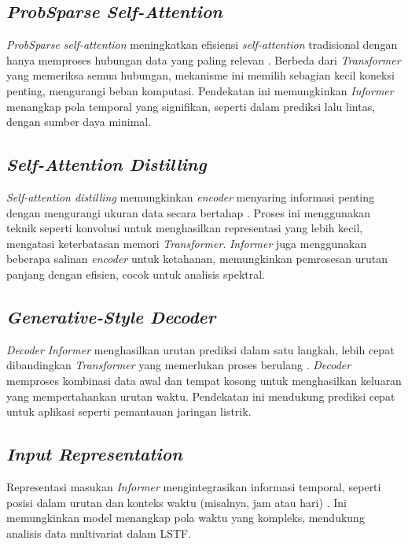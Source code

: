 \subsection{\textit{ProbSparse Self-Attention}}
\label{sec:probsparse}

\textit{ProbSparse self-attention} meningkatkan efisiensi \textit{self-attention} tradisional dengan hanya memproses hubungan data yang paling relevan \citep{Zhou2021}. Berbeda dari \textit{Transformer} yang memeriksa semua hubungan, mekanisme ini memilih sebagian kecil koneksi penting, mengurangi beban komputasi. Pendekatan ini memungkinkan \textit{Informer} menangkap pola temporal yang signifikan, seperti dalam prediksi lalu lintas, dengan sumber daya minimal.

\subsection{\textit{Self-Attention Distilling}}
\label{sec:distilling}

\textit{Self-attention distilling} memungkinkan \textit{encoder} menyaring informasi penting dengan mengurangi ukuran data secara bertahap \citep{Zhou2021}. Proses ini menggunakan teknik seperti konvolusi untuk menghasilkan representasi yang lebih kecil, mengatasi keterbatasan memori \textit{Transformer}. \textit{Informer} juga menggunakan beberapa salinan \textit{encoder} untuk ketahanan, memungkinkan pemrosesan urutan panjang dengan efisien, cocok untuk analisis spektral.

\subsection{\textit{Generative-Style Decoder}}
\label{sec:decoder}

\textit{Decoder} \textit{Informer} menghasilkan urutan prediksi dalam satu langkah, lebih cepat dibandingkan \textit{Transformer} yang memerlukan proses berulang \citep{Zhou2021}. \textit{Decoder} memproses kombinasi data awal dan tempat kosong untuk menghasilkan keluaran yang mempertahankan urutan waktu. Pendekatan ini mendukung prediksi cepat untuk aplikasi seperti pemantauan jaringan listrik.

\subsection{\textit{Input Representation}}
\label{sec:input_representation}

Representasi masukan \textit{Informer} mengintegrasikan informasi temporal, seperti posisi dalam urutan dan konteks waktu (misalnya, jam atau hari) \citep{Zhou2021}. Ini memungkinkan model menangkap pola waktu yang kompleks, mendukung analisis data multivariat dalam LSTF.

